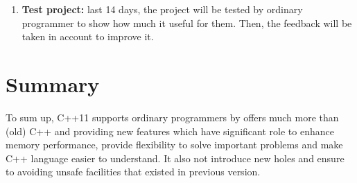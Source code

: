 \documentclass[11pt,]{report}
\begin{document}
\begin{enumerate}
\item \textbf{Test project:} last 14 days, the project will be tested by ordinary \linebreak programmer to show how much it useful for them. Then, the feedback will  be taken in account to improve it.

\end{enumerate}



\section{Summary}
\label{section: summary}

To sum up, C++11 supports ordinary programmers by offers much more than (old) C++  and  providing new features which have significant role to enhance memory performance, provide flexibility to solve important problems and make C++ language easier to understand. It also not introduce new holes and  ensure to avoiding unsafe facilities that existed in previous version.


	
\end{document}

